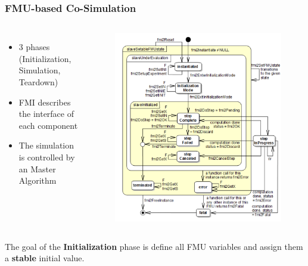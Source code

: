 \documentclass{beamer}
\begin{document}
\begin{frame}
\frametitle{FMU-based Co-Simulation}
\begin{columns}
\begin{itemize}
    \item 3 phases (Initialization, Simulation, Teardown)
    \item FMI describes the interface of each component
    \item The simulation is controlled by an Master Algorithm
\end{itemize}
\begin{figure}
    \centering
    \includegraphics[scale=0.3]{images/Screenshot 2020-09-09 at 08.38.44.png}
\end{figure}
\end{columns}

The goal of the \textbf{Initialization} phase is define all FMU variables and assign them a \textbf{stable} initial value.
\end{frame}
\end{document}
